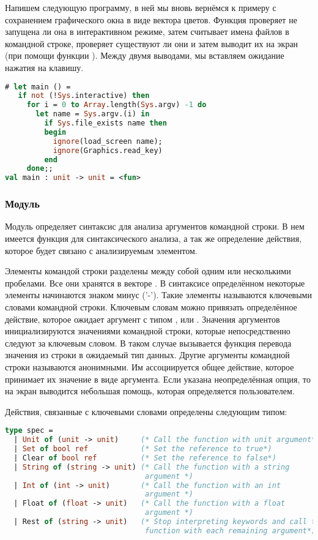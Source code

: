 Напишем следующую программу, в ней мы вновь вернёмся к примеру с сохранением 
графического окна в виде вектора цветов. Функция  проверяет не 
запущена ли она в интерактивном режиме, затем считывает имена файлов в командной 
строке, проверяет существуют ли они и затем выводит их на экран (при помощи 
функции ). Между двумя выводами, мы вставляем ожидание 
нажатия на клавишу.

\begin{lstlisting}[language=OCaml]
# let main () =
   if not (!Sys.interactive) then 
     for i = 0 to Array.length(Sys.argv) -1 do 
       let name = Sys.argv.(i) in 
         if Sys.file_exists name then 
         begin
           ignore(load_screen name);
           ignore(Graphics.read_key)
         end
     done;;
val main : unit -> unit = <fun>
\end{lstlisting}

\subsubsection{Модуль }
\label{subsubsec:module_arg}

Модуль  определяет синтаксис для анализа аргументов командной строки. 
В нем имеется функция для синтаксического анализа, а так же определение 
действия, которое будет связано с анализируемым элементом.

Элементы командой строки разделены между собой одним или несколькими пробелами. 
Все они хранятся в векторе . В синтаксисе определённом 
 некоторые элементы начинаются знаком минус ('-'). Такие 
элементы называются ключевыми словами командной строки. Ключевым словам можно 
привязать определённое действие, которое ожидает аргумент с типом 
,  или . Значения аргументов инициализируются 
значениями командной строки, которые непосредственно следуют за ключевым словом. 
В таком случае вызывается функция перевода значения из строки в ожидаемый тип 
данных. Другие аргументы командной строки называются анонимными. Им 
ассоциируется общее действие, которое принимает их значение в виде аргумента. 
Если указана неопределённая опция, то на экран выводится небольшая помощь, 
которая определяется пользователем.

Действия, связанные с ключевыми словами определены следующим типом:

\begin{lstlisting}[language=OCaml]
type spec =
  | Unit of (unit -> unit)     (* Call the function with unit argument*)
  | Set of bool ref            (* Set the reference to true*)
  | Clear of bool ref          (* Set the reference to false*)
  | String of (string -> unit) (* Call the function with a string 
                                argument *)
  | Int of (int -> unit)       (* Call the function with an int 
                                argument *)
  | Float of (float -> unit)   (* Call the function with a float 
                                argument *)
  | Rest of (string -> unit)   (* Stop interpreting keywords and call the
                                function with each remaining argument*)
\end{lstlisting}

